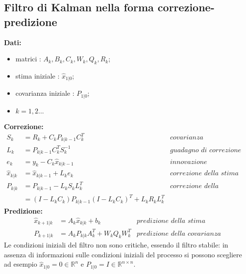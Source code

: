 \subsection{Filtro di Kalman nella forma correzione-predizione}
\textbf{Dati:}
\begin{itemize}
\item matrici : $A_k,B_k,C_k,W_k,Q_k,R_k$;
\item stima iniziale : $\hat{x}_{1|0}$;
\item covarianza iniziale : $P_{1|0}$;
\item $k=1,2... $
\end{itemize}
\textbf{Correzione:}
\begin{align*}
S_k&=R_k+C_kP_{k|k-1}C_k^T &\textit{covarianza dell’innovazione}  \\
L_k&=P_{k|k-1}C_k^TS_k^{-1} &\textit{guadagno di correzione}  \\
e_k&=y_k-C_k\hat{x}_{k|k-1} &\textit{innovazione}  \\
\hat{x}_{k|k}&=\hat{x}_{k|k-1}+L_ke_k &\textit{correzione della stima}\\
P_{k|k}&=P_{k|k-1}-L_kS_kL_k^T &\textit{correzione della covarianza}\\
&=(I-L_kC_k)P_{k|k-1}(I-L_kC_k)^T+L_kR_kL_k^T
\end{align*}
\textbf{Predizione:}
\begin{align*}
\hat{x}_{k+1|k}&=A_k\hat{x}_{k|k}+b_k &\textit{predizione della stima}\\
P_{k+1|k}&=A_kP_{k|k}A_k^T+W_kQ_kW_k^T &\textit{predizione della covarianza}
\end{align*}
Le condizioni iniziali del filtro non sono critiche, essendo il filtro stabile: in assenza di informazioni sulle condizioni iniziali del processo si possono scegliere ad esempio $\hat{x}_{1|0}=0 \in \mathbb{R}^n$ e $P_{1|0}=I \in \mathbb{R}^{n \times n}$.
\newpage